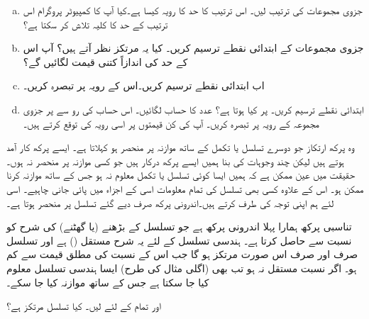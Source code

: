 \begin{enumerate}[a.]
\item
جزوی مجموعات  کی ترتیب لیں۔ اس ترتیب کا حد کا رویہ  کیسا ہے۔کیا آپ کا کمپیوٹر پروگرام اس ترتیب کے حد کا کلیہ تلاش کر سکتا ہے؟
\item
جزوی مجموعات کے ابتدائی  نقطے  ترسیم کریں۔  کیا یہ مرتکز نظر آتے ہیں؟ آپ اس کے حد کی اندازاً کتنی قیمت لگائیں گے؟
\item
اب ابتدائی  نقطے   ترسیم کریں۔اس کے رویہ پر تبصرہ کریں۔
\item
ابتدائی  نقطے   ترسیم کریں۔  پر کیا ہوتا ہے؟ عدد  کا حساب لگائیں۔ اس حساب کی رو سے  پر جزوی مجموعہ کے رویہ پر تبصرہ کریں۔ آپ  کی کن قیمتوں پر اسی رویہ کی توقع کرتے ہیں۔  
\end{enumerate}

وہ پرکھ ارتکاز  جو دوسرے تسلسل یا تکمل کے ساتھ موازنہ پر منحصر ہو  کہلاتا ہے۔ ایسے پرکھ کار آمد ہوتے ہیں لیکن چند وجوہات کی بنا ہمیں ایسے پرکھ درکار ہیں جو کسی موازنہ پر منحصر نہ ہوں۔ حقیقت میں عین ممکن ہے کہ ہمیں ایسا کوئی تسلسل یا تکمل معلوم نہ ہو جس کے ساتھ موازنہ کرنا ممکن ہو۔ اس کے علاوہ کسی بھی تسلسل کی تمام معلومات اسی کے اجزاء میں پائی جانی چاہیے۔ اسی لئے ہم اپنی توجہ  کی طرف  کرتے ہیں۔اندرونی پرکھ صرف دیے گئے تسلسل پر منحصر ہوتا ہے۔

تناسبی پرکھ ہمارا پہلا اندرونی پرکھ ہے جو تسلسل کے بڑھنے (یا گھٹنے) کی شرح کو نسبت  سے حاصل کرتا ہے۔ ہندسی تسلسل  کے لئے یہ شرح مستقل () ہے اور تسلسل صرف اور صرف اس صورت مرتکز ہو گا جب اس کے نسبت کی مطلق قیمت  سے کم ہو۔ اگر نسبت مستقل نہ ہو تب بھی (اگلی مثال کی طرح) ایسا ہندسی تسلسل معلوم کیا جا سکتا ہے جس کے ساتھ موازنہ کیا جا سکے۔

 اور تمام  کے لئے  لیں۔ کیا تسلسل  مرتکز ہے؟

